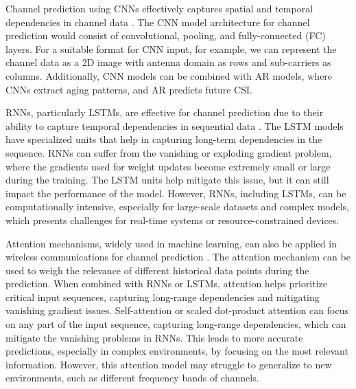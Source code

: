 \documentclass[lettersize,journal]{IEEEtran}
\begin{document}
Channel prediction using CNNs effectively captures spatial and temporal dependencies in channel data \cite{Yuan20}. The CNN model architecture for channel prediction would consist of convolutional, pooling, and fully-connected (FC) layers. For a suitable format for CNN input, for example, we can represent the channel data as a 2D image with antenna domain as rows and sub-carriers as columns. Additionally, CNN models can be combined with AR models, where CNNs extract aging patterns, and AR predicts future CSI.

RNNs, particularly LSTMs, are effective for channel prediction due to their ability to capture temporal dependencies in sequential data \cite{Jiang20}. The LSTM models have specialized units that help in capturing long-term dependencies in the sequence. RNNs can suffer from the vanishing or exploding gradient problem, where the gradients used for weight updates become extremely small or large during the training. The LSTM units help mitigate this issue, but it can still impact the performance of the model. However, RNNs, including LSTMs, can be computationally intensive, especially for large-scale datasets and complex models, which presents challenges for real-time systems or resource-constrained devices.

Attention mechanisms, widely used in machine learning, can also be applied in wireless communications for channel prediction \cite{Jiang22}. The attention mechanism can be used to weigh the relevance of different historical data points during the prediction. When combined with RNNs or LSTMs, attention helps prioritize critical input sequences, capturing long-range dependencies and mitigating vanishing gradient issues. Self-attention or scaled dot-product attention can focus on any part of the input sequence, capturing long-range dependencies, which can mitigate the vanishing problems in RNNs. This leads to more accurate predictions, especially in complex environments, by focusing on the most relevant information. However, this attention model may struggle to generalize to new environments, such as different frequency bands of channels.

\end{document}
